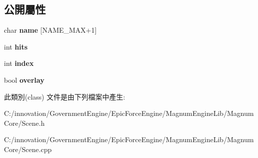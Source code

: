 \subsection*{公開屬性}
\begin{DoxyCompactItemize}
\item 
char {\bfseries name} \mbox{[}N\+A\+M\+E\+\_\+\+M\+AX+1\mbox{]}\hypertarget{class_i_dream_sky_1_1_scene_1_1_i_creator_a99ec7f3cb2d6fa7b882b04954ad701c0}{}\label{class_i_dream_sky_1_1_scene_1_1_i_creator_a99ec7f3cb2d6fa7b882b04954ad701c0}

\item 
int {\bfseries hits}\hypertarget{class_i_dream_sky_1_1_scene_1_1_i_creator_ae4a6d4a784f90223a783f4728638ac4f}{}\label{class_i_dream_sky_1_1_scene_1_1_i_creator_ae4a6d4a784f90223a783f4728638ac4f}

\item 
int {\bfseries index}\hypertarget{class_i_dream_sky_1_1_scene_1_1_i_creator_af402d70399f12945ab936661e3bc39c0}{}\label{class_i_dream_sky_1_1_scene_1_1_i_creator_af402d70399f12945ab936661e3bc39c0}

\item 
bool {\bfseries overlay}\hypertarget{class_i_dream_sky_1_1_scene_1_1_i_creator_ac1e98335fc8a66505555d9e9bdf24222}{}\label{class_i_dream_sky_1_1_scene_1_1_i_creator_ac1e98335fc8a66505555d9e9bdf24222}

\end{DoxyCompactItemize}


此類別(class) 文件是由下列檔案中產生\+:\begin{DoxyCompactItemize}
\item 
C\+:/innovation/\+Government\+Engine/\+Epic\+Force\+Engine/\+Magnum\+Engine\+Lib/\+Magnum\+Core/Scene.\+h\item 
C\+:/innovation/\+Government\+Engine/\+Epic\+Force\+Engine/\+Magnum\+Engine\+Lib/\+Magnum\+Core/Scene.\+cpp\end{DoxyCompactItemize}
